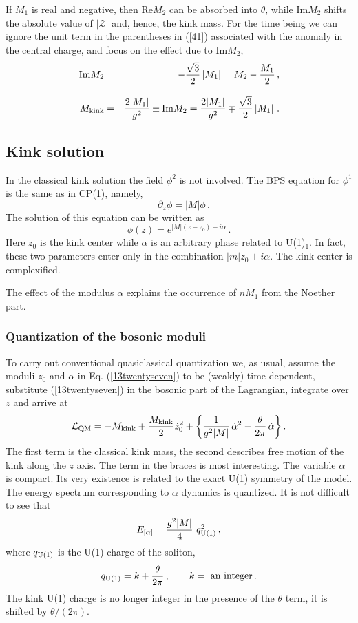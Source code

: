 \documentclass[epsfig,12pt]{article}
\def\beq{\begin{equation}}
\def\eeq{\end{equation}}
\def\beq{\begin{equation}}
\def\eeq{\end{equation}}
\newcommand{\mc}[1]{\mathcal{#1}}
\begin{document}
If $M_1$ is real and negative, then Re$M_2$  can be absorbed into $\theta$, while Im$M_2$ shifts
the absolute value of $|\mc{Z}|$ and, hence, the kink mass. For the time 
being we can ignore the unit term in the parentheses in (\ref{41}) associated with the anomaly in the central charge,
and focus on the effect due to  Im$M_2$,
\begin{eqnarray}
{\rm Im} M_2 
&=&
 -\frac{\sqrt 3}{2}\left|M_1\right| = M_2 - \frac{M_1}{2}\,,
 \nonumber\\[3mm]
 M_{\rm kink} 
 &=&
  \frac{2|M_1|}{g^2} \pm {\rm Im}M_2 =  \frac{2|M_1|}{g^2} \mp \frac{\sqrt 3}{2}\left|M_1\right| \,.
\end{eqnarray}


\subsection{Kink solution}

In the classical kink solution the field $\phi^2$ is not involved. The BPS equation for $\phi^1$ is the same as in CP(1), namely,
\beq
\quad \partial_z \phi = |M| \phi\,.
\label{13twentysix}
\eeq
The solution of this equation  can be written as
\beq
\phi (z) = e^{|M|(z-z_0) -i\alpha}\,.
\label{13twentyseven}
\eeq
Here $z_0$ is the kink center while $\alpha$ is an arbitrary phase related to U(1)$_1$.
In fact, these two parameters enter only in the combination
$|m| z_0 +i\alpha$. The kink center 
is complexified. 

The effect of the modulus $\alpha$ explains the occurrence of 
$nM_1$ from the Noether part.



\subsubsection{Quantization of the bosonic moduli}

To carry out  conventional
quasiclassical quantization we, as usual,
assume the moduli $z_0$ and $\alpha$ in Eq. (\ref{13twentyseven})
to be (weakly) time-dependent, substitute  (\ref{13twentyseven})
in the bosonic part of the Lagrangian, integrate over $z$
and arrive at
\beq
{\cal L}_{\rm QM} = -M_{\rm kink} +\frac{M_{\rm kink}}{2} \dot z_0^2 
+\left\{\frac{1}{g^2|M|}\, \dot\alpha^2  
-\frac{\theta}{2\pi}\,\dot\alpha
\right\}.
\label{13twentynine}
\eeq
The first term is the classical kink mass, the second describes
free motion of the kink along the $z$ axis.
The term in the braces is most interesting.
The variable $\alpha$ is compact.
Its very existence is related to the exact U(1) symmetry of the model.
The energy spectrum corresponding
to $\alpha$ dynamics is quantized.
It is not difficult to see that
\beq
E_{[\alpha ]}= \frac{g^2 |M|}{4}\,\, q_{\rm U(1)}^2\,,
\label{13thirty}
\eeq
where
$ q_{\rm U(1)}$ is the U(1) charge of the soliton,
\beq
 q_{\rm U(1)} = k +\frac{\theta}{2\pi}\,,\qquad k =\mbox{ an integer}\,.
\label{13thirtyone}
\eeq
The kink U(1) charge is no longer integer
in the presence of the $\theta$ term, it is shifted by $\theta/(2\pi )$.
\end{document}
